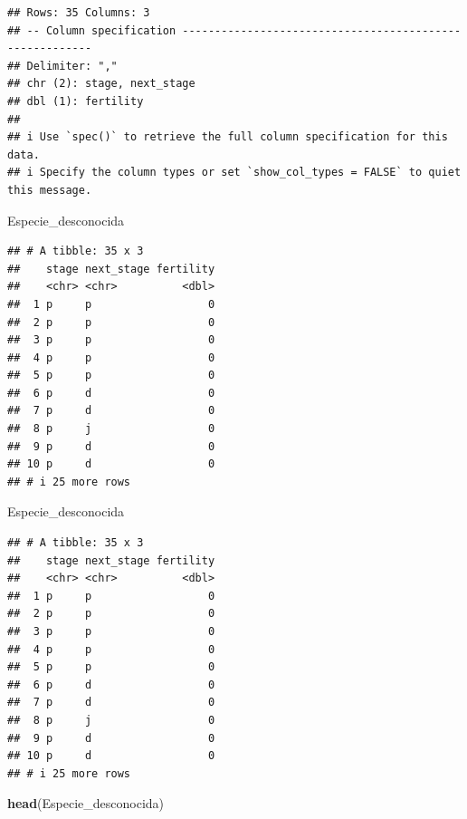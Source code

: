 \documentclass[
]{book}
\newenvironment{Shaded}{\begin{snugshade}}{\end{snugshade}}
\newcommand{\FunctionTok}[1]{\textcolor[rgb]{0.13,0.29,0.53}{\textbf{#1}}}
\newcommand{\NormalTok}[1]{#1}
\theoremstyle{definition}
\theoremstyle{definition}
\theoremstyle{definition}
\theoremstyle{definition}
\theoremstyle{remark}
\begin{document}
\begin{verbatim}
## Rows: 35 Columns: 3
## -- Column specification --------------------------------------------------------
## Delimiter: ","
## chr (2): stage, next_stage
## dbl (1): fertility
## 
## i Use `spec()` to retrieve the full column specification for this data.
## i Specify the column types or set `show_col_types = FALSE` to quiet this message.
\end{verbatim}

\begin{Shaded}
\begin{Highlighting}[]
\NormalTok{Especie\_desconocida}
\end{Highlighting}
\end{Shaded}

\begin{verbatim}
## # A tibble: 35 x 3
##    stage next_stage fertility
##    <chr> <chr>          <dbl>
##  1 p     p                  0
##  2 p     p                  0
##  3 p     p                  0
##  4 p     p                  0
##  5 p     p                  0
##  6 p     d                  0
##  7 p     d                  0
##  8 p     j                  0
##  9 p     d                  0
## 10 p     d                  0
## # i 25 more rows
\end{verbatim}

\begin{Shaded}
\begin{Highlighting}[]
\NormalTok{Especie\_desconocida}
\end{Highlighting}
\end{Shaded}

\begin{verbatim}
## # A tibble: 35 x 3
##    stage next_stage fertility
##    <chr> <chr>          <dbl>
##  1 p     p                  0
##  2 p     p                  0
##  3 p     p                  0
##  4 p     p                  0
##  5 p     p                  0
##  6 p     d                  0
##  7 p     d                  0
##  8 p     j                  0
##  9 p     d                  0
## 10 p     d                  0
## # i 25 more rows
\end{verbatim}

\begin{Shaded}
\begin{Highlighting}[]
\FunctionTok{head}\NormalTok{(Especie\_desconocida)}
\end{Highlighting}
\end{Shaded}
\end{document}
